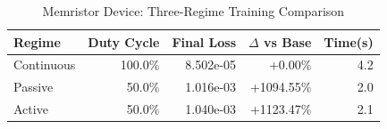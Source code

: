 \begin{table}[htbp]
\centering
\caption{Memristor Device: Three-Regime Training Comparison}
\label{tab:memristor_regimes}
\begin{tabular}{lrrrr}
\hline
Regime & Duty Cycle & Final Loss & $\Delta$ vs Base & Time(s) \\
\hline
Continuous & 100.0\% & 8.502e-05 & +0.00\% & 4.2 \\
Passive & 50.0\% & 1.016e-03 & +1094.55\% & 2.0 \\
Active & 50.0\% & 1.040e-03 & +1123.47\% & 2.1 \\
\hline
\end{tabular}
\end{table}
